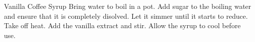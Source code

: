 \documentclass[../cookbook.tex]{subfiles}
\begin{document}
\begin{recipe}{Vanilla Coffee Syrup}{}{}
    Bring water to boil in a pot.
    Add sugar to the boiling water and ensure that it is completely disolved.
    Let it simmer until it starts to reduce. Take off heat.
    Add the vanilla extract and stir. Allow the syrup to cool before use.
\end{recipe}
\end{document}
